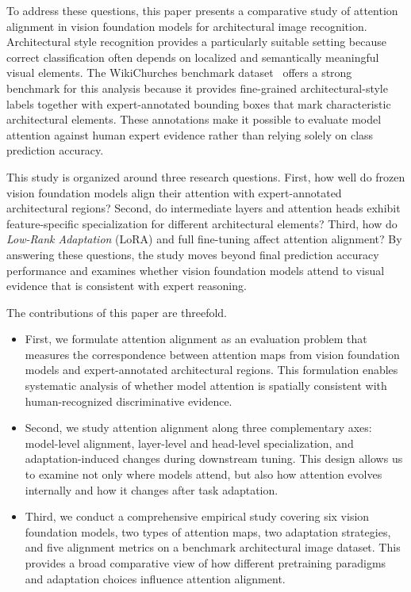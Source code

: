 \documentclass[lineno,pdflatex,sn-mathphys-num]{sn-jnl}%
\theoremstyle{thmstyleone}%
\theoremstyle{thmstyletwo}%
\theoremstyle{thmstylethree}%
\begin{document}
To address these questions, this paper presents a comparative study of attention alignment in vision foundation models for architectural image recognition. Architectural style recognition provides a particularly suitable setting because correct classification often depends on localized and semantically meaningful visual elements. The WikiChurches benchmark dataset~\cite{Barz21WikiChurches} offers a strong benchmark for this analysis because it provides fine-grained architectural-style labels together with expert-annotated bounding boxes that mark characteristic architectural elements. These annotations make it possible to evaluate model attention against human expert evidence rather than relying solely on class prediction accuracy.

This study is organized around three research questions. First, how well do frozen vision foundation models align their attention with expert-annotated architectural regions? Second, do intermediate layers and attention heads exhibit feature-specific specialization for different architectural elements? Third, how do \textit{Low-Rank Adaptation} (LoRA) \cite{hu2022lora} and full fine-tuning affect attention alignment? By answering these questions, the study moves beyond final prediction accuracy performance and examines whether vision foundation models attend to visual evidence that is consistent with expert reasoning.

The contributions of this paper are threefold.
\begin{itemize}
\item First, we formulate attention alignment as an evaluation problem that measures the correspondence between attention maps from vision foundation models and expert-annotated architectural regions. This formulation enables systematic analysis of whether model attention is spatially consistent with human-recognized discriminative evidence.
\item Second, we study attention alignment along three complementary axes: model-level alignment, layer-level and head-level specialization, and adaptation-induced changes during downstream tuning. This design allows us to examine not only where models attend, but also how attention evolves internally and how it changes after task adaptation.
\item Third, we conduct a comprehensive empirical study covering six vision foundation models, two types of attention maps, two adaptation strategies, and five alignment metrics on a benchmark architectural image dataset. This provides a broad comparative view of how different pretraining paradigms and adaptation choices influence attention alignment.
\end{itemize}
\end{document}
